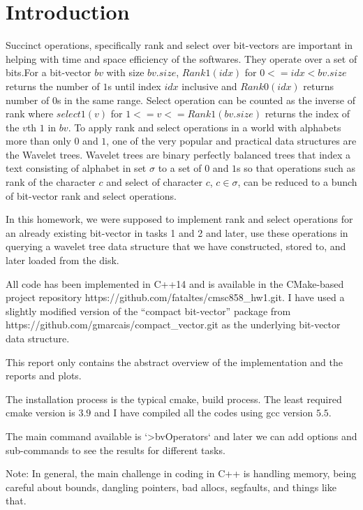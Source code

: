 \documentclass[11pt]{article}
\begin{document}
    \section{Introduction}
    Succinct operations, specifically rank and select over bit-vectors are important in helping with time and space efficiency of the softwares.
    They operate over a set of bits.For a bit-vector $bv$ with size $bv.size$, $Rank1(idx)$ for $0<=idx<bv.size$
    returns the number of $1$s until index $idx$ inclusive and $Rank0(idx)$ returns number of $0$s in the same range.
    Select operation can be counted as the inverse of rank where $select1(v)$ for $1<=v<=Rank1(bv.size)$ returns the index of the $v$th $1$ in $bv$.
    To apply rank and select operations in a world with alphabets more than only $0$ and $1$, one of the very popular
    and practical data structures are the Wavelet trees. Wavelet trees are binary perfectly balanced trees
    that index a text consisting of alphabet in set $\sigma$ to a set of $0$ and $1$s so that operations such as rank of the character $c$
    and select of character $c$, $c \in \sigma$, can be reduced to a bunch of bit-vector rank and select operations.

    In this homework, we were supposed to implement rank and select operations for an already existing bit-vector in tasks 1 and 2
    and later, use these operations in querying a wavelet tree data structure that we have constructed, stored to, and later loaded from the disk.

    All code has been implemented in C++14 and is available in the CMake-based project repository https://github.com/fataltes/cmsc858_hw1.git.
    I have used a slightly modified version of the ``compact bit-vector'' package from https://github.com/gmarcais/compact_vector.git as the underlying bit-vector data structure.

    This report only contains the abstract overview of the implementation and the reports and plots.

    The installation process is the typical cmake, build process. The least required cmake version is $3.9$
    and I have compiled all the codes using gcc version $5.5$.

    The main command available is `>bvOperators` and later we can add options and sub-commands to see the results for different tasks.

    Note: In general, the main challenge in coding in C++ is handling memory, being careful about bounds, dangling pointers, bad allocs, segfaults, and things like that.
\end{document}
